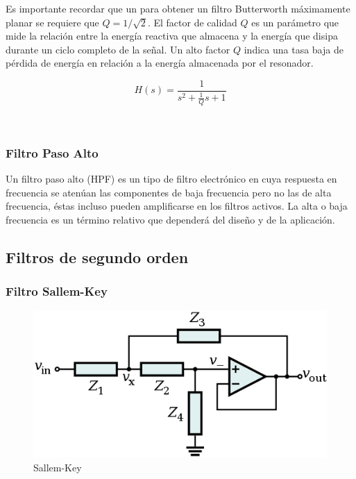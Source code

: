 \documentclass{article}
\begin{document}
Es importante recordar que un para obtener un filtro Butterworth
máximamente planar se requiere que $Q=1/\sqrt{2}$. El factor de calidad
$Q$ es un parámetro que mide la relación entre la energía reactiva que
almacena y la energía que disipa durante un ciclo completo de la señal.
Un alto factor $Q$ indica una tasa baja de pérdida de energía en
relación a la energía almacenada por el resonador.

\begin{equation}
H(s) = \frac{1}{  s^{2} + \frac{1}{Q} s + 1 } 
\end{equation}


    \begin{center}
    \end{center}
    { \hspace*{\fill} \\}
    
    \subsubsection{Filtro Paso Alto}\label{filtro-paso-alto}

Un filtro paso alto (HPF) es un tipo de filtro electrónico en cuya
respuesta en frecuencia se atenúan las componentes de baja frecuencia
pero no las de alta frecuencia, éstas incluso pueden amplificarse en los
filtros activos. La alta o baja frecuencia es un término relativo que
dependerá del diseño y de la aplicación.

\subsection{Filtros de segundo orden}\label{filtros-de-segundo-orden}

\subsubsection{Filtro Sallem-Key}\label{filtro-sallem-key}

\begin{figure}[htbp]
\centering
\includegraphics{images/sallemkeyideal.png}
\caption{Sallem-Key}
\end{figure}
\end{document}
